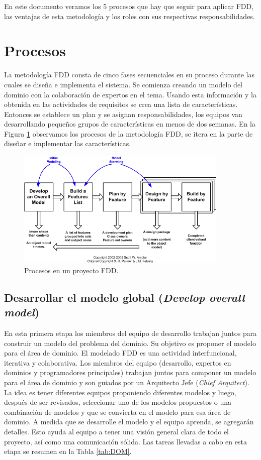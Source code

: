 \documentclass[11pt]{article}
\begin{document}
En este documento veramos los 5 procesos que hay que seguir para aplicar FDD, las ventajas de esta metodología y los roles con sus respectivas responsabilidades.

\section{Procesos}

La metodología FDD consta de cinco fases secuenciales en su proceso durante las cuales se diseña e implementa el sistema. Se comienza creando un modelo del dominio con la colaboración de expertos en el tema. Usando esta información y la obtenida en las actividades de requisitos se crea una lista de características. Entonces se establece un plan y se asignan responsabilidades, los equipos van desarrollando pequeños grupos de características en menos de dos semanas. En la Figura \ref{fig:proc} observamos los procesos de la metodología FDD, se itera en la parte de diseñar e implementar las características.

\begin{figure}[H]
    \centering
    \includegraphics[width=0.9\textwidth]{lifecycle}
    \caption{Procesos en un proyecto FDD.}
    \label{fig:proc}
\end{figure}

\subsection{Desarrollar el modelo global (\textit{Develop overall model})}
En esta primera etapa los miembros del equipo de desarrollo trabajan juntos para construir un modelo del problema del dominio. Su objetivo es proponer el modelo para el área de dominio. El modelado FDD es una actividad interfuncional, iterativa y colaborativa. Los miembros del equipo (desarrollo, expertos en dominios y programadores principales) trabajan juntos para componer un modelo para el área de dominio y son guiados por un Arquitecto Jefe (\textit{Chief Arquitect}). La idea es tener diferentes equipos proponiendo diferentes modelos y luego, después de ser revisados, seleccionar uno de los modelos propuestos o una combinación de modelos y que se convierta en el modelo para esa área de dominio. A medida que se desarrolle el modelo y el equipo aprenda, se agregarán detalles. Esto ayuda al equipo a tener una visión general clara de todo el proyecto, así como una comunicación sólida. Las tareas llevadas a cabo en esta etapa se resumen en la Tabla \ref{tab:DOM}. 
\end{document}
